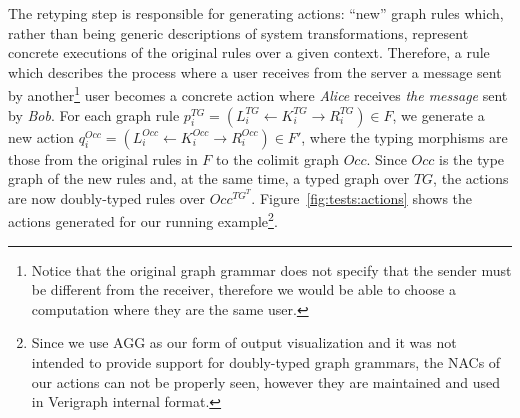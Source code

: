 The retyping step is responsible for generating actions: ``new'' graph rules which, rather than being generic descriptions of system transformations, represent concrete executions of the original rules over a given context. Therefore, a rule which describes the process where a user receives from the server a message sent by another\footnote{Notice that the original graph grammar does not specify that the sender must be different from the receiver, therefore we would be able to choose a
computation where they are the same user.} user becomes a concrete action where \textit{Alice} receives \textit{the message} sent by \textit{Bob}.
For each graph rule $\mbox{$p_i^{TG} = \left(L_i^{TG} \leftarrow K_i^{TG} \rightarrow R_i^{TG}\right)$} \in F$, we generate a new action \mbox{$q_i^{Occ} = \left(L_i^{Occ} \leftarrow K_i^{Occ} \rightarrow R_i^{Occ}\right) \in F'$}, where the typing morphisms are those from the original rules in $F$ to the colimit graph $Occ$. Since $Occ$ is the type graph of the new rules and, at the same time, a typed graph over $TG$, the actions are now doubly-typed rules over $Occ^{TG^T}$.
Figure~\ref{fig:tests:actions} shows the actions generated for our running example\footnote{ Since we use AGG as our form of output visualization and it was not intended to provide support for doubly-typed graph grammars, the NACs of our actions can not be properly seen, however they are maintained and used in Verigraph internal format.}.


